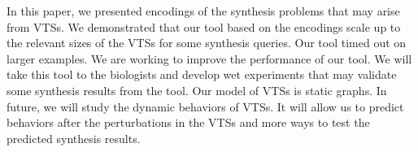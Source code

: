 In this paper, we presented encodings of the synthesis problems
that may arise from VTSs.
%
We demonstrated that our tool based on the encodings
scale up to the relevant sizes of the VTSs for some synthesis queries.
%
Our tool timed out on larger examples.
%
We are working to improve the performance of our tool.
%
We will take this tool to the biologists and develop wet experiments that may validate some synthesis results from the tool.
%
Our model of VTSs is static graphs.
%
In future, we will study the dynamic behaviors of VTSs.
%
It will allow us to predict behaviors after the perturbations in the VTSs
and more ways to test the predicted synthesis results.

